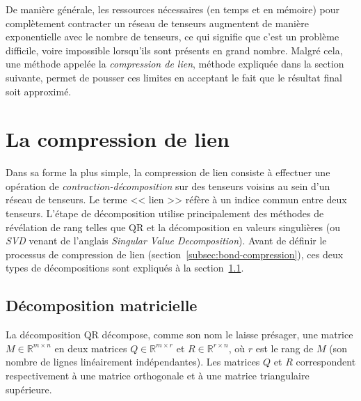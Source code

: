 De manière générale, les ressources nécessaires (en temps et en mémoire) pour complètement contracter un réseau de tenseurs augmentent de manière exponentielle avec le nombre de tenseurs, ce qui signifie que c'est un problème difficile, voire impossible lorsqu'ils sont présents en grand nombre.
Malgré cela, une méthode appelée la \emph{compression de lien}, méthode expliquée dans la section suivante, permet de pousser ces limites en acceptant le fait que le résultat final soit approximé.


\section{La compression de lien}\label{sec:compression}
Dans sa forme la plus simple, la compression de lien consiste à effectuer une opération de \emph{contraction-décomposition} sur des tenseurs voisins au sein d'un réseau de tenseurs.
Le terme << lien >> réfère à un indice commun entre deux tenseurs.
L'étape de décomposition utilise principalement des méthodes de révélation de rang telles que QR et la décomposition en valeurs singulières (ou \textit{SVD} venant de l'anglais \textit{Singular Value Decomposition}).
Avant de définir le processus de compression de lien (section~\ref{subsec:bond-compression}), ces deux types de décompositions sont expliqués à la section~\ref{subsec:QR-and-SVD}.

\subsection{Décomposition matricielle}\label{subsec:QR-and-SVD}
La décomposition QR décompose, comme son nom le laisse présager, une matrice $M \in \mathbb{R}^{m \times n}$ en deux matrices $Q \in \mathbb{R}^{m \times r}$ et $R \in \mathbb{R}^{r \times n}$, où $r$ est le rang de $M$ (son nombre de lignes linéairement indépendantes).
Les matrices $Q$ et $R$ correspondent respectivement à une matrice orthogonale et à une matrice triangulaire supérieure.

